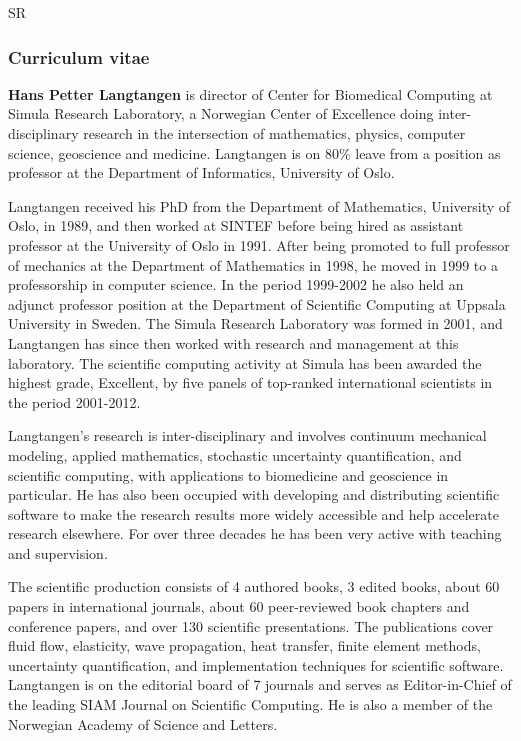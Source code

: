 \begin{sitedescription}{SR}
\subsubsection*{Curriculum vitae}


{\bf Hans Petter Langtangen} is director of Center for Biomedical Computing at Simula Research Laboratory, a Norwegian Center of Excellence doing inter-disciplinary research in the intersection of mathematics, physics, computer science, geoscience and medicine. Langtangen is on 80\% leave from a position as professor at the Department of Informatics, University of Oslo.

Langtangen received his PhD from the Department of Mathematics, University of Oslo, in 1989, and then worked at SINTEF before being hired as assistant professor at the University of Oslo in 1991. After being promoted to full professor of mechanics at the Department of Mathematics in 1998, he moved in 1999 to a professorship in computer science. In the period 1999-2002 he also held an adjunct professor position at the Department of Scientific Computing at Uppsala University in Sweden. The Simula Research Laboratory was formed in 2001, and Langtangen has since then worked with research and management at this laboratory. The scientific computing activity at Simula has been awarded the highest grade, Excellent, by five panels of top-ranked international scientists in the period 2001-2012.

Langtangen's research is inter-disciplinary and involves continuum mechanical modeling, applied mathematics, stochastic uncertainty quantification, and scientific computing, with applications to biomedicine and geoscience in particular. He has also been occupied with developing and distributing scientific software to make the research results more widely accessible and help accelerate research elsewhere. For over three decades he has been very active with teaching and supervision.

The scientific production consists of 4 authored books, 3 edited books, about 60 papers in international journals, about 60 peer-reviewed book chapters and conference papers, and over 130 scientific presentations. The publications cover fluid flow, elasticity, wave propagation, heat transfer, finite element methods, uncertainty quantification, and implementation techniques for scientific software. Langtangen is on the editorial board of 7 journals and serves as Editor-in-Chief of the leading SIAM Journal on Scientific Computing. He is also a member of the Norwegian Academy of Science and Letters.
%
%
%


\end{sitedescription}

